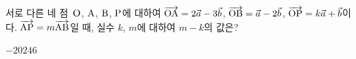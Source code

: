 서로 다른 네 점~$\mathrm{O}$, $\mathrm{A}$, $\mathrm{B}$, $\mathrm{P}$에 대하여 $\overrightarrow{\mathrm{OA}}=2\vec{a}-3\vec{b}$, $\overrightarrow{\mathrm{OB}}=\vec{a}-2\vec{b}$, $\overrightarrow{\mathrm{OP}}=k\vec{a}+\vec{b}$이다. $\overrightarrow{\mathrm{AP}}=m\overrightarrow{\mathrm{AB}}$일 때, 실수 $k$, $m$에 대하여 $m-k$의 값은? 
\begin{choices32}{$-2$}{$0$}{$2$}{$4$}{$6$}\end{choices32}
